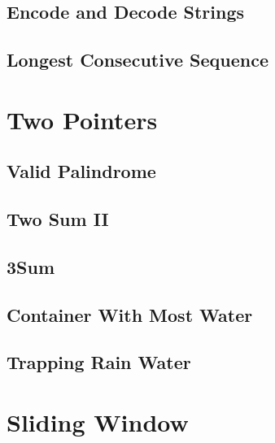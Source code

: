 \documentclass[12pt,letterpaper]{book}
\theoremstyle{definition}
\theoremstyle{remark}
\begin{document}

\section{Encode and Decode Strings}


\section{Longest Consecutive Sequence}


\chapter{Two Pointers}

\section{Valid Palindrome}


\section{Two Sum II}


\section{3Sum}


\section{Container With Most Water}


\section{Trapping Rain Water}


\chapter{Sliding Window}
\end{document}
